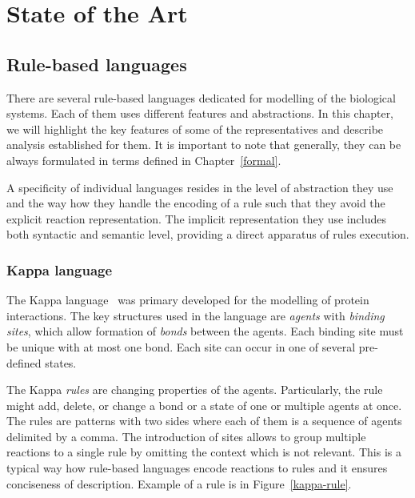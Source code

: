 \documentclass[11pt,a4paper]{report}
\begin{document}
\chapter{State of the Art} \label{chap:state}

\section{Rule-based languages}
\label{rule_based_languages}

There are several rule-based languages dedicated for modelling of the biological systems. Each of them uses different features and abstractions. In this chapter, we will highlight the key features of some of the representatives and describe analysis established for them. It is important to note that generally, they can be always formulated in terms defined in Chapter~\ref{formal}.

A specificity of individual languages resides in the level of abstraction they use and the way how they handle the encoding of a rule such that they avoid the explicit reaction representation. The implicit representation they use includes both syntactic and semantic level, providing a direct apparatus of rules execution.

\subsection{Kappa language}
\label{kappa}

The Kappa language~\cite{kappa_formal} was primary developed for the modelling of protein interactions. The key structures used in the language are \emph{agents} with \emph{binding sites}, which allow formation of \emph{bonds} between the agents. Each binding site must be unique with at most one bond. Each site can occur in one of several pre-defined states.

The Kappa \emph{rules} are changing properties of the agents. Particularly, the rule might add, delete, or change a bond or a state of one or multiple agents at once. The rules are patterns with two sides where each of them is a sequence of agents delimited by a comma. The introduction of sites allows to group multiple reactions to a single rule by omitting the context which is not relevant. This is a typical way how rule-based languages encode reactions to rules and it ensures conciseness of description. Example of a rule is in Figure~\ref{kappa-rule}.
\end{document}
